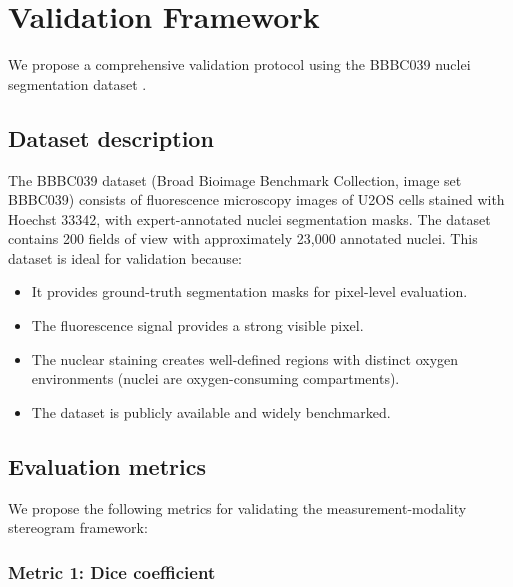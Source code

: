 \documentclass[11pt,twocolumn,a4paper]{article}
\begin{document}


\section{Validation Framework}\label{sec:validation}

We propose a comprehensive validation protocol using the BBBC039 nuclei segmentation dataset \citep{BBBC039,Caicedo2019}.

\subsection{Dataset description}

The BBBC039 dataset (Broad Bioimage Benchmark Collection, image set BBBC039) consists of fluorescence microscopy images of U2OS cells stained with Hoechst 33342, with expert-annotated nuclei segmentation masks.
The dataset contains 200 fields of view with approximately 23,000 annotated nuclei.
This dataset is ideal for validation because:
\begin{itemize}
\item It provides ground-truth segmentation masks for pixel-level evaluation.
\item The fluorescence signal provides a strong visible pixel.
\item The nuclear staining creates well-defined regions with distinct oxygen environments (nuclei are oxygen-consuming compartments).
\item The dataset is publicly available and widely benchmarked.
\end{itemize}

\subsection{Evaluation metrics}

We propose the following metrics for validating the measurement-modality stereogram framework:

\subsubsection{Metric 1: Dice coefficient}
\end{document}
